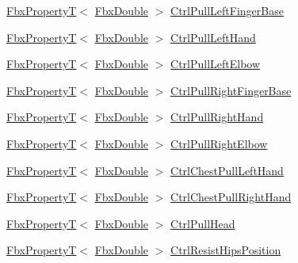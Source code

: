 \begin{DoxyCompactItemize}
\item 
\hyperlink{class_fbx_property_t}{Fbx\+PropertyT}$<$ \hyperlink{fbxtypes_8h_a171e72a1c46fc15c1a6c9c31948c1c5b}{Fbx\+Double} $>$ \hyperlink{class_fbx_character_af2b72f5ec76ccfca0a59cba911ee42cd}{Ctrl\+Pull\+Left\+Finger\+Base}
\item 
\hyperlink{class_fbx_property_t}{Fbx\+PropertyT}$<$ \hyperlink{fbxtypes_8h_a171e72a1c46fc15c1a6c9c31948c1c5b}{Fbx\+Double} $>$ \hyperlink{class_fbx_character_a7d7dd16a8fffa5e2c277f8ec952bba6d}{Ctrl\+Pull\+Left\+Hand}
\item 
\hyperlink{class_fbx_property_t}{Fbx\+PropertyT}$<$ \hyperlink{fbxtypes_8h_a171e72a1c46fc15c1a6c9c31948c1c5b}{Fbx\+Double} $>$ \hyperlink{class_fbx_character_a92f7ba20e81f5bbe5ea18bb2476a2daf}{Ctrl\+Pull\+Left\+Elbow}
\item 
\hyperlink{class_fbx_property_t}{Fbx\+PropertyT}$<$ \hyperlink{fbxtypes_8h_a171e72a1c46fc15c1a6c9c31948c1c5b}{Fbx\+Double} $>$ \hyperlink{class_fbx_character_abf8f8567058b002645e8584572139d8e}{Ctrl\+Pull\+Right\+Finger\+Base}
\item 
\hyperlink{class_fbx_property_t}{Fbx\+PropertyT}$<$ \hyperlink{fbxtypes_8h_a171e72a1c46fc15c1a6c9c31948c1c5b}{Fbx\+Double} $>$ \hyperlink{class_fbx_character_a392d76b0a290f80f76f0aa9f7f513345}{Ctrl\+Pull\+Right\+Hand}
\item 
\hyperlink{class_fbx_property_t}{Fbx\+PropertyT}$<$ \hyperlink{fbxtypes_8h_a171e72a1c46fc15c1a6c9c31948c1c5b}{Fbx\+Double} $>$ \hyperlink{class_fbx_character_ad5f40480905710f698060eaee25b9f33}{Ctrl\+Pull\+Right\+Elbow}
\item 
\hyperlink{class_fbx_property_t}{Fbx\+PropertyT}$<$ \hyperlink{fbxtypes_8h_a171e72a1c46fc15c1a6c9c31948c1c5b}{Fbx\+Double} $>$ \hyperlink{class_fbx_character_a0b14fa3eedf09891f8b26348c44ba0a2}{Ctrl\+Chest\+Pull\+Left\+Hand}
\item 
\hyperlink{class_fbx_property_t}{Fbx\+PropertyT}$<$ \hyperlink{fbxtypes_8h_a171e72a1c46fc15c1a6c9c31948c1c5b}{Fbx\+Double} $>$ \hyperlink{class_fbx_character_a940ece5e038794193daa2c32e3d7c3b1}{Ctrl\+Chest\+Pull\+Right\+Hand}
\item 
\hyperlink{class_fbx_property_t}{Fbx\+PropertyT}$<$ \hyperlink{fbxtypes_8h_a171e72a1c46fc15c1a6c9c31948c1c5b}{Fbx\+Double} $>$ \hyperlink{class_fbx_character_a6ed3181826e8efd8b62ae4ea95cd3ef8}{Ctrl\+Pull\+Head}
\item 
\hyperlink{class_fbx_property_t}{Fbx\+PropertyT}$<$ \hyperlink{fbxtypes_8h_a171e72a1c46fc15c1a6c9c31948c1c5b}{Fbx\+Double} $>$ \hyperlink{class_fbx_character_a9df873c898296109d772b66c495158f2}{Ctrl\+Resist\+Hips\+Position}

\end{DoxyCompactItemize}
